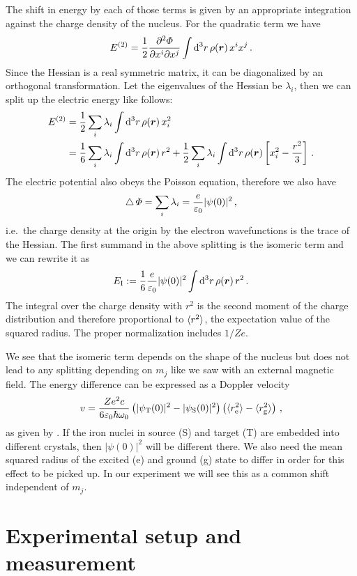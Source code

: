 \documentclass[11pt, english, fleqn, DIV=15, headinclude, BCOR=2cm]{scrreprt}
\begin{document}
The shift in energy by each of those terms is given by an appropriate
integration against the charge density of the nucleus. For the quadratic term
we have
\[
    E^{(2)} = \frac 12 \frac{\partial^2 \Phi}{\partial x^i \partial x^j}
    \int \dif^3 r \, \rho(\vec r) \, x^i x^j \,.
\]
Since the Hessian is a real symmetric matrix, it can be diagonalized by an
orthogonal transformation. Let the eigenvalues of the Hessian be $\lambda_i$,
then we can split up the electric energy like follows:
\begin{align*}
    E^{(2)}
    &= \frac12 \sum_i \lambda_i \int \dif^3 r \, \rho(\vec r) \, x_i^2 \\
    &= \frac16 \sum_i \lambda_i \int \dif^3 r \, \rho(\vec r) \, r^2
    + \frac12 \sum_i \lambda_i \int \dif^3 r \, \rho(\vec r) \sbr{x_i^2 -
    \frac{r^2}3} \,.
\end{align*}
The electric potential also obeys the Poisson equation, therefore we also have
\[
    \operatorname{\bigtriangleup} \Phi = \sum_i \lambda_i = \frac{e}{\varepsilon_0} |\psi(0)|^2 \,,
\]
i.e.\ the charge density at the origin by the electron wavefunctions is the
trace of the Hessian. The first summand in the above splitting is the isomeric
term and we can rewrite it as
\[
    E_\text I := \frac16 \frac{e}{\varepsilon_0} |\psi(0)|^2
    \int \dif^3 r \, \rho(\vec r) \, r^2 \,.
\]
The integral over the charge density with $r^2$ is the second moment of the
charge distribution and therefore proportional to $\langle r^2 \rangle$, the
expectation value of the squared radius. The proper normalization includes
$1/Ze$.

We see that the isomeric term depends on the shape of the nucleus but does not
lead to any splitting depending on $m_j$ like we saw with an external magnetic
field.
The energy difference can be expressed as a Doppler velocity
\[
    v = \frac{Z e^2 c}{6 \varepsilon_0 \hbar \omega_0}
    \left( |\psi_\text T(0)|^2 - |\psi_\text S(0)|^2 \right)
    \left( \langle r^2_\text{e} \rangle - \langle r^2_\text{g} \rangle \right) \,,
\]
as given by \textcite[(4.31)]{Schatz/Nukleare_Festkoerperphysik}. If the iron
nuclei in source (S) and target (T) are embedded into different crystals, then
$|\psi(0)|^2$ will be different there. We also need the mean squared radius of
the excited (e) and ground (g) state to differ in order for this effect to be
picked up. In our experiment we will see this as a common shift independent of
$m_j$.

\parencite[33, 34]{Schatz/Nukleare_Festkoerperphysik}

\chapter{Experimental setup and measurement}
\end{document}
